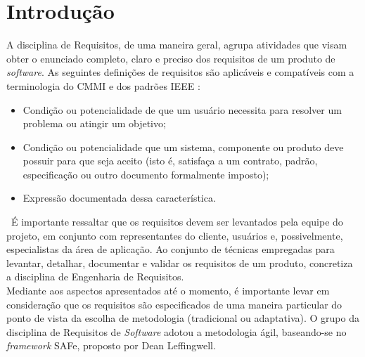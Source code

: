 \chapter[Introdução]{Introdução}
\label{chap:introducao}
	A disciplina de Requisitos, de uma maneira geral, agrupa atividades que visam obter o enunciado completo, claro e preciso dos requisitos de um produto de \emph{software}. As seguintes definições de requisitos são aplicáveis e compatíveis com a terminologia do CMMI e dos padrões IEEE \cite{eswilson}:
		\begin{itemize}
			\item{Condição ou potencialidade de que um usuário necessita para resolver um problema ou atingir um objetivo;}
			\item{Condição ou potencialidade que um sistema, componente ou produto deve possuir para que seja aceito (isto é, satisfaça a um contrato, padrão, especificação ou outro documento formalmente imposto);}
			\item{Expressão documentada dessa característica.}
		\end{itemize}
	\ \indent É importante ressaltar que os requisitos devem ser levantados pela equipe do projeto, em conjunto com representantes do cliente, usuários e, possivelmente, especialistas da área de aplicação. Ao conjunto de técnicas empregadas para levantar, detalhar, documentar e validar os requisitos de um produto, concretiza a disciplina de Engenharia de Requisitos.
	\\ \indent Mediante aos aspectos apresentados até o momento, é importante levar em consideração que os requisitos são especificados de uma maneira particular do ponto de vista da escolha de metodologia (tradicional ou adaptativa). O grupo da disciplina de 	Requisitos de \emph{Software} adotou a metodologia ágil, baseando-se no \emph{framework} SAFe, proposto por Dean Leffingwell.

